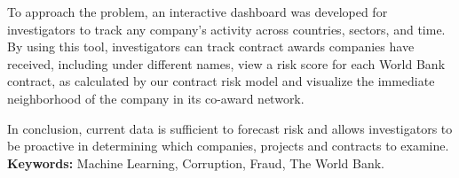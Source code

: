To approach the problem,  an interactive dashboard was developed for investigators to track any company's activity across countries, sectors, and time. By using this tool, investigators can track contract awards companies have received, including under different names, view a risk score for each World Bank contract, as calculated by our contract risk model and visualize the immediate neighborhood of the company in its co-award network.

In conclusion, current data is sufficient to forecast risk and allows  investigators to be proactive in determining which companies, projects and contracts to examine.
\thispagestyle{plain}
\vfill
\scriptsize \noindent \textbf{Keywords:} Machine Learning, Corruption, Fraud, The World Bank.
\normalsize